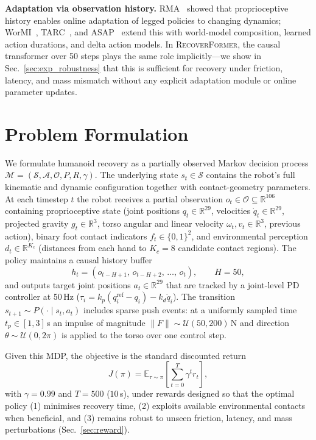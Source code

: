 \documentclass[conference,letterpaper]{IEEEtran}
\newcommand{\ot}{o_t}
\newcommand{\at}{a_t}
\newcommand{\hist}{h_t}
\newcommand{\methodname}{\textsc{RecoverFormer}}
\begin{document}
\textbf{Adaptation via observation history.}
RMA~\cite{kumar2021rma} showed that proprioceptive history enables online adaptation of legged policies to changing dynamics; WorMI~\cite{wormi2025}, TARC~\cite{tarc2025}, and ASAP~\cite{he2025asap} extend this with world-model composition, learned action durations, and delta action models. In \methodname{}, the causal transformer over 50 steps plays the same role implicitly---we show in Sec.~\ref{sec:exp_robustness} that this is sufficient for recovery under friction, latency, and mass mismatch without any explicit adaptation module or online parameter updates.

\section{Problem Formulation}
\label{sec:problem}

We formulate humanoid recovery as a partially observed Markov decision process $\mathcal{M}=(\mathcal{S},\mathcal{A},\mathcal{O},P,R,\gamma)$.
The underlying state $s_t\in\mathcal{S}$ contains the robot's full kinematic and dynamic configuration together with contact-geometry parameters.
At each timestep $t$ the robot receives a partial observation $\ot\in\mathcal{O}\subseteq\mathbb{R}^{106}$ containing proprioceptive state (joint positions $q_t\in\mathbb{R}^{29}$, velocities $\dot{q}_t\in\mathbb{R}^{29}$, projected gravity $g_t\in\mathbb{R}^3$, torso angular and linear velocity $\omega_t,v_t\in\mathbb{R}^3$, previous action), binary foot contact indicators $f_t\in\{0,1\}^2$, and environmental perception $d_t\in\mathbb{R}^{K_c}$ (distances from each hand to $K_c=8$ candidate contact regions).
The policy maintains a causal history buffer
\begin{equation}
    \hist = (o_{t-H+1},\,o_{t-H+2},\,\ldots,\,\ot),\qquad H=50,
\end{equation}
and outputs target joint positions $\at\in\mathbb{R}^{29}$ that are tracked by a joint-level PD controller at 50\,Hz ($\tau_i = k_p(q^{\mathrm{ref}}_i-q_i)-k_d\dot q_i$).
The transition $s_{t+1}\sim P(\cdot\mid s_t,\at)$ includes sparse push events: at a uniformly sampled time $t_p\in[1,3]\,$s an impulse of magnitude $\|F\|\sim\mathcal U(50,200)\,$N and direction $\theta\sim\mathcal U(0,2\pi)$ is applied to the torso over one control step.

Given this MDP, the objective is the standard discounted return
\begin{equation}
    J(\pi) = \mathbb{E}_{\tau\sim\pi}\!\left[\sum_{t=0}^{T}\gamma^t r_t\right],
\end{equation}
with $\gamma{=}0.99$ and $T=500$ ($10$\,s), under rewards designed so that the optimal policy (1) minimises recovery time, (2) exploits available environmental contacts when beneficial, and (3) remains robust to unseen friction, latency, and mass perturbations (Sec.~\ref{sec:reward}).
\end{document}
